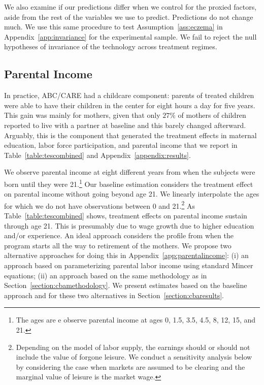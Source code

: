 We also examine if our predictions differ when we control for the proxied factors, aside from the rest of the variables we use to predict. Predictions do not change much. We use this same procedure to test Assumption~\ref{ass:eczema} in Appendix~\ref{app:invariance} for the experimental sample. We fail to reject the null hypotheses of invariance of the technology across treatment regimes.

\subsection{Parental Income} \label{section:pincome}

In practice, ABC/CARE had a childcare component: parents of treated children were able to have their children in the center for eight hours a day for five years. This gain was mainly for mothers, given that only $27\%$ of mothers of children reported to live with a partner at baseline and this barely changed afterward. Arguably, this is the component that generated the treatment effects in maternal education, labor force participation, and parental income that we report in Table~\ref{table:tescombined} and Appendix~\ref{appendix:results}.

We observe parental income at eight different years from when the subjects were born until they were 21.\footnote{The ages are e observe parental income at ages 0, 1.5, 3.5, 4.5, 8, 12, 15, and 21.} Our baseline estimation considers the treatment effect on parental income without going beyond age 21. We linearly interpolate the ages for which we do not have observations between 0 and 21.\footnote{Depending on the model of labor supply, the earnings should or should not include the value of forgone leisure. We conduct a sensitivity analysis below by considering the case when markets are assumed to be clearing and the marginal value of leisure is the market wage.} As Table~\ref{table:tescombined} shows, treatment effects on parental income sustain through age 21. This is presumably due to wage growth due to higher education and/or experience. An ideal approach considers the profile from when the program starts all the way to retirement of the mothers. We propose two alternative approaches for doing this in Appendix~\ref{app:parentalincome}: (i) an approach based on parameterizing parental labor income using standard Mincer equations; (ii) an approach based on the same methodology as in Section~\ref{section:cbamethodology}. We present estimates based on the baseline approach and for these two alternatives in Section~\ref{section:cbaresults}.

